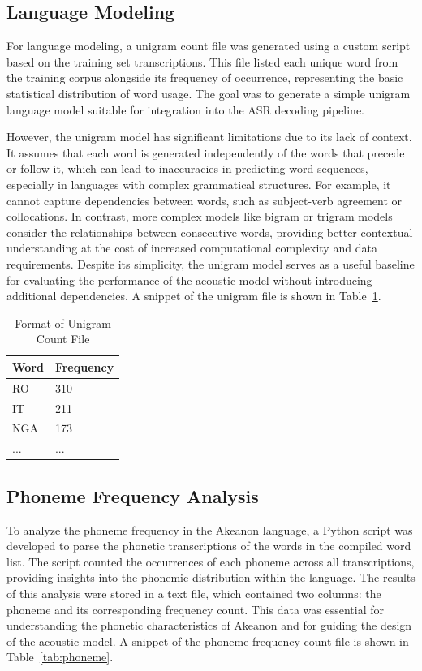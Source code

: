 \subsection{Language Modeling}
For language modeling, a unigram count file was generated using a custom script based on the training set transcriptions. This file listed each unique word from the training corpus alongside its frequency of occurrence, representing the basic statistical distribution of word usage. The goal was to generate a simple unigram language model suitable for integration into the ASR decoding pipeline.

However, the unigram model has significant limitations due to its lack of context. It assumes that each word is generated independently of the words that precede or follow it, which can lead to inaccuracies in predicting word sequences, especially in languages with complex grammatical structures. For example, it cannot capture dependencies between words, such as subject-verb agreement or collocations. In contrast, more complex models like bigram or trigram models consider the relationships between consecutive words, providing better contextual understanding at the cost of increased computational complexity and data requirements. Despite its simplicity, the unigram model serves as a useful baseline for evaluating the performance of the acoustic model without introducing additional dependencies. A snippet of the unigram file is shown in Table~\ref{tab:unigram}.

\begin{table}[h]
\centering
\caption{Format of Unigram Count File}
\label{tab:unigram}
\begin{tabular}{ll}
\toprule
\textbf{Word} & \textbf{Frequency} \\
\midrule
RO            & 310 \\
IT            & 211  \\
NGA           & 173  \\
...           & ... \\
\bottomrule
\end{tabular}
\end{table}

\subsection{Phoneme Frequency Analysis}
To analyze the phoneme frequency in the Akeanon language, a Python script was developed to parse the phonetic transcriptions of the words in the compiled word list. The script counted the occurrences of each phoneme across all transcriptions, providing insights into the phonemic distribution within the language. The results of this analysis were stored in a text file, which contained two columns: the phoneme and its corresponding frequency count. This data was essential for understanding the phonetic characteristics of Akeanon and for guiding the design of the acoustic model. A snippet of the phoneme frequency count file is shown in Table~\ref{tab:phoneme}.

